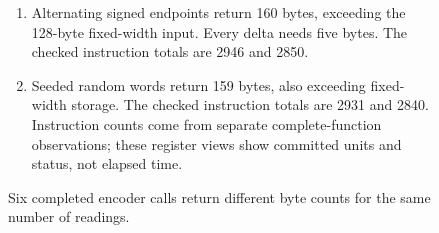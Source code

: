 \begin{figure}[htbp]
\begin{minipage}{\linewidth}
\begin{enumerate}
      \item Alternating signed endpoints return 160 bytes, exceeding the 128-byte fixed-width input. Every delta needs five bytes. The checked instruction totals are 2946 and 2850.
      \item Seeded random words return 159 bytes, also exceeding fixed-width storage. The checked instruction totals are 2931 and 2840. Instruction counts come from separate complete-function observations; these register views show committed units and status, not elapsed time.
    \end{enumerate}
  \end{minipage}
  \caption{Six completed encoder calls return different byte counts for the same number of readings.}
  \label{capture:023-delta-varint-f04}
  \label{delta-f04}
\end{figure}
\par
